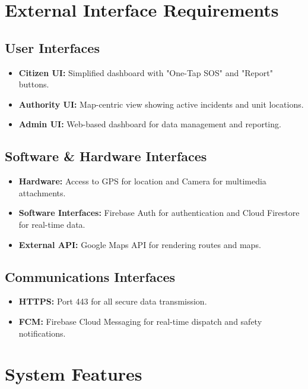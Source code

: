 \documentclass[11pt,a4paper]{article}
\begin{document}
\section{External Interface Requirements}

\subsection{User Interfaces}
\begin{itemize}
    \item \textbf{Citizen UI:} Simplified dashboard with "One-Tap SOS" and "Report" buttons.
    \item \textbf{Authority UI:} Map-centric view showing active incidents and unit locations.
    \item \textbf{Admin UI:} Web-based dashboard for data management and reporting.
\end{itemize}

\subsection{Software \& Hardware Interfaces}
\begin{itemize}
    \item \textbf{Hardware:} Access to GPS for location and Camera for multimedia attachments.
    \item \textbf{Software Interfaces:} Firebase Auth for authentication and Cloud Firestore for real-time data.
    \item \textbf{External API:} Google Maps API for rendering routes and maps.
\end{itemize}

\subsection{Communications Interfaces}
\begin{itemize}
    \item \textbf{HTTPS:} Port 443 for all secure data transmission.
    \item \textbf{FCM:} Firebase Cloud Messaging for real-time dispatch and safety notifications.
\end{itemize}

\section{System Features}
\end{document}
